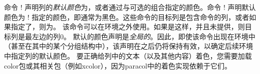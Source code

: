 命令 \!\columncolor! 声明列的\emph{默认颜色}为，或者通过与可选的组合指定的颜色。命令 \!\normalcolumncolor! 声明默认颜色为 \!\normalcolor! 指定的颜色，即通常为黑色。这些命令的目标列是包含命令的列，或者如果指定了，则为。
% 
该命令可以在环境之外使用。如果是这样，并且未提供，则目标列是最左边的列0。
% 
默认的颜色声明是\emph{全局的}。因此，即使该命令出现在环境中（甚至在其中的某个分组结构中），该声明在\Endparacol{}之后仍将保持有效，以确定后续环境中指定列的默认颜色。
% 
要正确给列中的文本（以及其他内容）着色，您需要加载\textsf{color}包或其相关包（例如\textsf{xcolor}），因为\textsf{paracol}中的着色实现依赖于它们。

